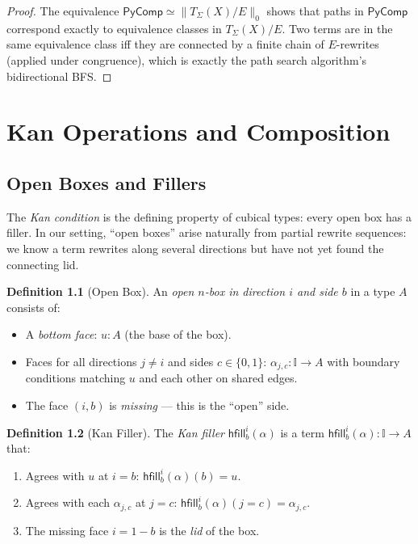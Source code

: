 \documentclass[11pt,a4paper]{report}
\theoremstyle{definition}
\newtheorem{definition}{Definition}[chapter]
\theoremstyle{plain}
\newcommand{\interval}{\mathbb{I}}
\newcommand{\hfilling}{\mathsf{hfill}}
\begin{document}
\begin{proof}
The equivalence $\mathsf{PyComp} \simeq \|T_\Sigma(X)/E\|_0$ shows
that paths in $\mathsf{PyComp}$ correspond exactly to equivalence
classes in $T_\Sigma(X)/E$.  Two terms are in the same equivalence
class iff they are connected by a finite chain of $E$-rewrites (applied
under congruence), which is exactly the path search algorithm's
bidirectional BFS.
\end{proof}


\chapter{Kan Operations and Composition}
\label{ch:kan}

\section{Open Boxes and Fillers}

The \emph{Kan condition} is the defining property of cubical types:
every open box has a filler.  In our setting, ``open boxes'' arise
naturally from partial rewrite sequences: we know a term rewrites
along several directions but have not yet found the connecting lid.

\begin{definition}[Open Box]
An \emph{open $n$-box in direction $i$ and side $b$} in a type $A$
consists of:
\begin{itemize}
  \item A \emph{bottom face}: $u : A$ (the base of the box).
  \item Faces for all directions $j \neq i$ and sides $c \in \{0,1\}$:
    $\alpha_{j,c} : \interval \to A$ with boundary conditions matching
    $u$ and each other on shared edges.
  \item The face $(i, b)$ is \emph{missing} --- this is the ``open''
    side.
\end{itemize}
\end{definition}

\begin{definition}[Kan Filler]
The \emph{Kan filler} $\hfilling^i_b(\alpha)$ is a term
$\hfilling^i_b(\alpha) : \interval \to A$ that:
\begin{enumerate}
  \item Agrees with $u$ at $i = b$:
    $\hfilling^i_b(\alpha)(b) = u$.
  \item Agrees with each $\alpha_{j,c}$ at $j = c$:
    $\hfilling^i_b(\alpha)(j = c) = \alpha_{j,c}$.
  \item The missing face $i = 1-b$ is the \emph{lid} of the box.
\end{enumerate}
\end{definition}
\end{document}

